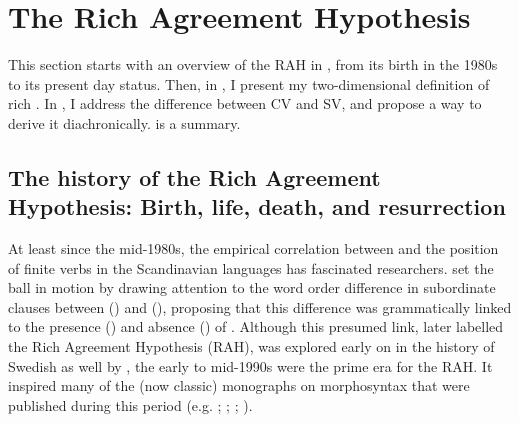 \documentclass[output=paper,colorlinks,citecolor=brown,draft,draftmode]{langscibook}
\begin{document}
\section{The Rich Agreement Hypothesis }\label{sec:petzell:4}


This section starts with an overview of the RAH in , from its birth in the 1980s to its present day status. Then, in , I present my two-dimensional definition of rich . In , I address the difference between CV and SV, and propose a way to derive it diachronically.  is a summary.


\subsection{The history of the Rich Agreement Hypothesis: Birth, life, death, and resurrection}\label{sec:petzell:4.1}
\begin{sloppypar}
At least since the mid-1980s, the empirical correlation between  and the position of finite verbs in the Scandinavian languages has fascinated researchers. \citet{Kosmeijer1986} set the ball in motion by drawing attention to the word order difference in subordinate clauses between  () and  (), proposing that this difference was grammatically linked to the presence () and absence () of . Although this presumed link, later labelled the Rich Agreement Hypothesis (RAH), was explored early on in the history of Swedish as well by \citet{Platzack1988emergence}, the early to mid-1990s were the prime era for the RAH. It inspired many of the (now classic) monographs on  morphosyntax that were published during this period (e.g. \citealt{Falk1993}; \citealt{Rohrbacher1994}; \citealt{Vikner1994}; \citealt{HolmbergPlatzack1995}). 
\end{sloppypar}
\end{document}
